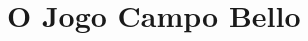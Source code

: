 \documentclass[a4paper]{article}
\begin{document}

\newpage

%
%
%
%
%
%
%


\section{O Jogo Campo Bello}
\end{document}
